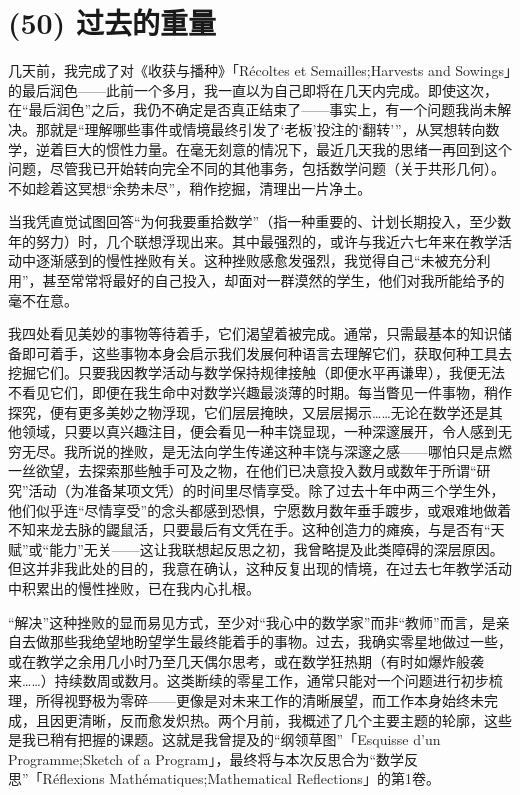 \section{(50) 过去的重量}

几天前，我完成了对《收获与播种》「Récoltes et Semailles;Harvests and Sowings」的最后润色——此前一个多月，我一直以为自己即将在几天内完成。即使这次，在“最后润色”之后，我仍不确定是否真正结束了——事实上，有一个问题我尚未解决。那就是“理解哪些事件或情境最终引发了‘老板’投注的‘翻转’”，从冥想转向数学，逆着巨大的惯性力量。在毫无刻意的情况下，最近几天我的思绪一再回到这个问题，尽管我已开始转向完全不同的其他事务，包括数学问题（关于共形几何）。不如趁着这冥想“余势未尽”，稍作挖掘，清理出一片净土。

当我凭直觉试图回答“为何我要重拾数学”（指一种重要的、计划长期投入，至少数年的努力）时，几个联想浮现出来。其中最强烈的，或许与我近六七年来在教学活动中逐渐感到的慢性挫败有关。这种挫败感愈发强烈，我觉得自己“未被充分利用”，甚至常常将最好的自己投入，却面对一群漠然的学生，他们对我所能给予的毫不在意。

我四处看见美妙的事物等待着手，它们渴望着被完成。通常，只需最基本的知识储备即可着手，这些事物本身会启示我们发展何种语言去理解它们，获取何种工具去挖掘它们。只要我因教学活动与数学保持规律接触（即便水平再谦卑），我便无法不看见它们，即便在我生命中对数学兴趣最淡薄的时期。每当瞥见一件事物，稍作探究，便有更多美妙之物浮现，它们层层掩映，又层层揭示……无论在数学还是其他领域，只要以真兴趣注目，便会看见一种丰饶显现，一种深邃展开，令人感到无穷无尽。我所说的挫败，是无法向学生传递这种丰饶与深邃之感——哪怕只是点燃一丝欲望，去探索那些触手可及之物，在他们已决意投入数月或数年于所谓“研究”活动（为准备某项文凭）的时间里尽情享受。除了过去十年中两三个学生外，他们似乎连“尽情享受”的念头都感到恐惧，宁愿数月数年垂手踱步，或艰难地做着不知来龙去脉的鼹鼠活，只要最后有文凭在手。这种创造力的瘫痪，与是否有“天赋”或“能力”无关——这让我联想起反思之初，我曾略提及此类障碍的深层原因。但这并非我此处的目的，我意在确认，这种反复出现的情境，在过去七年教学活动中积累出的慢性挫败，已在我内心扎根。

“解决”这种挫败的显而易见方式，至少对“我心中的数学家”而非“教师”而言，是亲自去做那些我绝望地盼望学生最终能着手的事物。过去，我确实零星地做过一些，或在教学之余用几小时乃至几天偶尔思考，或在数学狂热期（有时如爆炸般袭来……）持续数周或数月。这类断续的零星工作，通常只能对一个问题进行初步梳理，所得视野极为零碎——更像是对未来工作的清晰展望，而工作本身始终未完成，且因更清晰，反而愈发炽热。两个月前，我概述了几个主要主题的轮廓，这些是我已稍有把握的课题。这就是我曾提及的“纲领草图”「Esquisse d'un Programme;Sketch of a Program」，最终将与本次反思合为“数学反思”「Réflexions Mathématiques;Mathematical Reflections」的第1卷。

